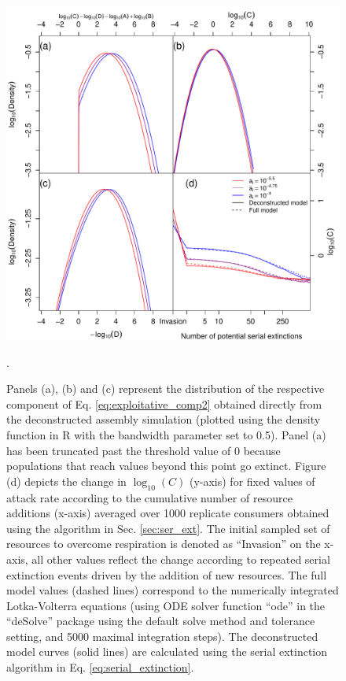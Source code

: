 \documentclass[a4paper]{report}
\DeclareMathOperator{\log}{log}
\begin{document}
{\begin{figure}[H]
\centering{}
\includegraphics[scale=0.75]{../Images/components_with_without_serial_scaled_older.pdf}
\caption{Panels (a), (b) and (c) represent the distribution of the respective component of Eq. \eqref{eq:exploitative_comp2} obtained directly from the deconstructed assembly simulation (plotted using the density function in R with the bandwidth parameter set to 0.5). Panel (a) has been truncated past the threshold value of 0 because populations that reach values beyond this point go extinct. Figure (d) depicts the change in $\log_{10}(C)$ (y-axis) for fixed values of attack rate according to the cumulative number of resource additions (x-axis) averaged over 1000 replicate consumers obtained using the algorithm in Sec. \ref{sec:ser_ext}. The initial sampled set of resources to overcome respiration is denoted as “Invasion” on the x-axis, all other values reflect the change according to repeated serial extinction events driven by the addition of new resources. The full model values (dashed lines) correspond to the numerically integrated Lotka-Volterra equations (using ODE solver function “ode” in the “deSolve” package using the default solve method and tolerance setting, and 5000 maximal integration steps). The deconstructed model curves (solid lines) are calculated using the serial extinction algorithm in Eq. \eqref{eq:serial_extinction}. \label{fig:comp_decon}}.
\end{figure}

}
\end{document}
